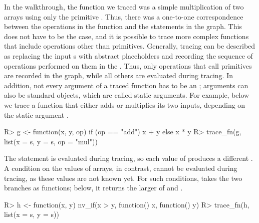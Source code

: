 \documentclass[article,shortnames]{jss}
\renewenvironment{CodeChunk}{\par\addvspace{0.6\baselineskip}\noindent\begin{minipage}{\linewidth}}{\end{minipage}\par\vspace{0.6\baselineskip}}
\begin{document}
In the walkthrough, the  function we traced was a simple multiplication of two arrays using only the primitive .
Thus, there was a one-to-one correspondence between the operations in the function and the statements in the graph.
This does not have to be the case, and it is possible to trace more complex functions that include operations other than  primitives.
Generally, tracing can be described as replacing the input s with abstract placeholders and recording the sequence of operations performed on them in the .
Thus, only operations that call  primitives are recorded in the graph, while all others are evaluated during tracing.
In addition, not every argument of a traced function has to be an ; arguments can also be standard  objects, which are called static arguments.
For example, below we trace a function that either adds or multiplies its two inputs, depending on the static argument .

\begin{CodeChunk}
\begin{CodeInput}
R> g <- function(x, y, op) if (op == "add") x + y else x * y
R> trace_fn(g, list(x = s, y = s, op = "mul"))
\end{CodeInput}
\end{CodeChunk}

The  statement is evaluated during tracing, so each value of  produces a different .
A condition on the values of arrays, in contrast, cannot be evaluated during tracing, as these values are not known yet.
For such conditions,  takes the two branches as functions; below, it returns the larger of  and .

\begin{CodeChunk}
\begin{CodeInput}
R> h <- function(x, y) nv_if(x > y, function() x, function() y)
R> trace_fn(h, list(x = s, y = s))
\end{CodeInput}
\end{CodeChunk}
\end{document}
